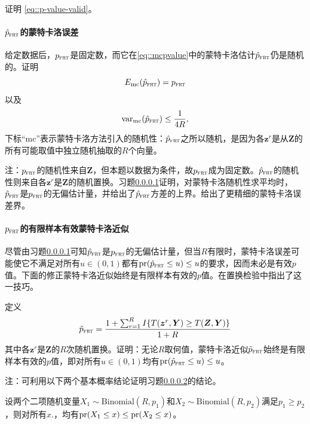 证明 \eqref{eq::p-value-valid}。 



\paragraph{$\hat p_{\textsc{frt}}$的蒙特卡洛误差}\label{para::monte-carlo-error-pfrt}

给定数据后，$p_{\textsc{frt}}$是固定数，而它在\eqref{eq::mcpvalue}中的蒙特卡洛估计$\hat p_{\textsc{frt}}$仍是随机的。证明
$$
E_{\text{mc}} (\hat p_{\textsc{frt}}) =   p_{\textsc{frt}}
$$
以及
$$
\textup{var}_{\text{mc}} (\hat p_{\textsc{frt}})  \leq \frac{1}{4R},
$$
下标“mc”表示蒙特卡洛方法引入的随机性：$\hat p_{\textsc{frt}}$之所以随机，是因为各$\bm{z}^r$是从$\bm{Z}$的所有可能取值中独立随机抽取的$R$个向量。


注：$p_{\textsc{frt}}$的随机性来自$\bm{Z}$，但本题以数据为条件，故$p_{\textsc{frt}}$成为固定数。$\hat p_{\textsc{frt}}$的随机性则来自各$\bm{z}^r$是$\bm{Z}$的随机置换。习题\ref{para::monte-carlo-error-pfrt}证明，对蒙特卡洛随机性求平均时，$\hat p_{\textsc{frt}}$是$p_{\textsc{frt}}$的无偏估计量，并给出了$\hat p_{\textsc{frt}}$方差的上界。\citet[][Theorem 2]{luo2021leveraging}给出了更精细的蒙特卡洛误差界。




\paragraph{$p_{\textsc{frt}}$的有限样本有效蒙特卡洛近似}\label{para::finite-sample-exact-monte-carlo-frt}


尽管由习题\ref{para::monte-carlo-error-pfrt}可知$\hat p_{\textsc{frt}}$是$p_{\textsc{frt}}$的无偏估计量，但当$R$有限时，蒙特卡洛误差可能使它不满足对所有$u\in (0,1)$都有$\textup{pr}(\hat p_{\textsc{frt}} \leq u) \leq u$的要求，因而未必是有效$p$值。下面的修正蒙特卡洛近似始终是有限样本有效的$p$值。\citet{phipson2010permutation}在置换检验中指出了这一技巧。



定义
$$
\tilde p_{\textsc{frt}}  =  \frac{  1 + \sum_{r=1}^R   I\{ T(\bm{z}^r,\bm{Y})   \geq T(\bm{Z},\bm{Y})   \}  }{1+R}
$$
其中各$\bm{z}^r$是$\bm{Z}$的$R$次随机置换。证明：无论$R$取何值，蒙特卡洛近似$\tilde p_{\textsc{frt}} $始终是有限样本有效的$p$值，即对所有$u\in (0,1)$均有$\textup{pr}(\tilde p_{\textsc{frt}} \leq u) \leq u$。


 
注：可利用以下两个基本概率结论证明习题\ref{para::finite-sample-exact-monte-carlo-frt}的结论。 


\begin{lemma}
\label{lemma::binomial-order}
设两个二项随机变量$X_1\sim \text{Binomial}(R, p_1)$和$X_2\sim \text{Binomial}(R, p_2)$满足$p_1\geq p_2$，则对所有$x.$，均有$\textup{pr}(X_1\leq x) \leq  \textup{pr}(X_2\leq x) $。
\end{lemma}


